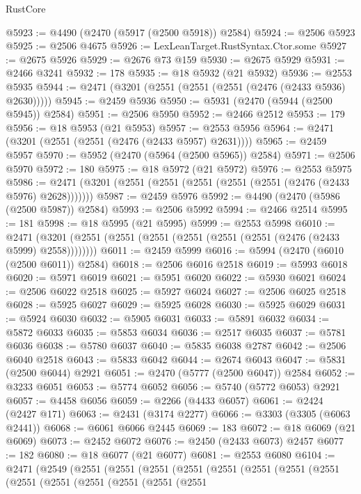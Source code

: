 \begin{lexlean}{RustCore}
\begin{coremodule}
@5923 := @4490 (@2470 (@5917 (@2500 @5918)) @2584)
@5924 := @2506 @5923
@5925 := @2506 @4675
@5926 := LexLeanTarget.RustSyntax.Ctor.some
@5927 := @2675 @5926
@5929 := @2676 @73 @159
@5930 := @2675 @5929
@5931 := @2466 @3241
@5932 := 178
@5935 := @18 @5932 (@21 @5932)
@5936 := @2553 @5935
@5944 := @2471 (@3201 (@2551 (@2551 (@2551 (@2476 (@2433 @5936) @2630)))))
@5945 := @2459 @5936
@5950 := @5931 (@2470 (@5944 (@2500 @5945)) @2584)
@5951 := @2506 @5950
@5952 := @2466 @2512
@5953 := 179
@5956 := @18 @5953 (@21 @5953)
@5957 := @2553 @5956
@5964 := @2471 (@3201 (@2551 (@2551 (@2476 (@2433 @5957) @2631))))
@5965 := @2459 @5957
@5970 := @5952 (@2470 (@5964 (@2500 @5965)) @2584)
@5971 := @2506 @5970
@5972 := 180
@5975 := @18 @5972 (@21 @5972)
@5976 := @2553 @5975
@5986 := @2471 (@3201 (@2551 (@2551 (@2551 (@2551 (@2551 (@2476 (@2433 @5976) @2628)))))))
@5987 := @2459 @5976
@5992 := @4490 (@2470 (@5986 (@2500 @5987)) @2584)
@5993 := @2506 @5992
@5994 := @2466 @2514
@5995 := 181
@5998 := @18 @5995 (@21 @5995)
@5999 := @2553 @5998
@6010 := @2471 (@3201 (@2551 (@2551 (@2551 (@2551 (@2551 (@2551 (@2476 (@2433 @5999) @2558))))))))
@6011 := @2459 @5999
@6016 := @5994 (@2470 (@6010 (@2500 @6011)) @2584)
@6018 := @2506 @6016 @2518
@6019 := @5993 @6018
@6020 := @5971 @6019
@6021 := @5951 @6020
@6022 := @5930 @6021
@6024 := @2506 @6022 @2518
@6025 := @5927 @6024
@6027 := @2506 @6025 @2518
@6028 := @5925 @6027
@6029 := @5925 @6028
@6030 := @5925 @6029
@6031 := @5924 @6030
@6032 := @5905 @6031
@6033 := @5891 @6032
@6034 := @5872 @6033
@6035 := @5853 @6034
@6036 := @2517 @6035
@6037 := @5781 @6036
@6038 := @5780 @6037
@6040 := @5835 @6038 @2787
@6042 := @2506 @6040 @2518
@6043 := @5833 @6042
@6044 := @2674 @6043
@6047 := @5831 (@2500 @6044) @2921
@6051 := @2470 (@5777 (@2500 @6047)) @2584
@6052 := @3233 @6051
@6053 := @5774 @6052
@6056 := @5740 (@5772 @6053) @2921
@6057 := @4458 @6056
@6059 := @2266 (@4433 @6057)
@6061 := @2424 (@2427 @171)
@6063 := @2431 (@3174 @2277)
@6066 := @3303 (@3305 (@6063 @2441))
@6068 := @6061 @6066 @2445
@6069 := 183
@6072 := @18 @6069 (@21 @6069)
@6073 := @2452 @6072
@6076 := @2450 (@2433 @6073) @2457
@6077 := 182
@6080 := @18 @6077 (@21 @6077)
@6081 := @2553 @6080
@6104 := @2471
    (@2549
      (@2551
        (@2551
          (@2551
            (@2551
              (@2551
                (@2551
                  (@2551
                    (@2551
                      (@2551
                        (@2551
                          (@2551
                            (@2551
                              (@2551
                                (@2551

\end{coremodule}
\end{lexlean}
